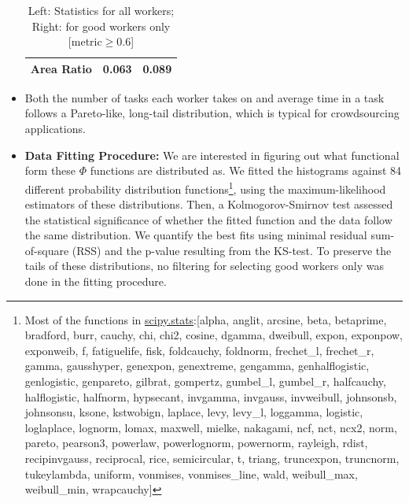 \documentclass[12pt]{article}
\begin{document}
\begin{itemize}
\begin{table}[h]
\begin{tabular}{lrr}
 Area Ratio       &  0.063 &  0.089 \\
\hline
\end{tabular}
\caption{Left: Statistics for all workers; Right: for good workers only [metric$\geq$0.6]}
\label{basic_stat}
\end{table}
\item Both the number of tasks each worker takes on and average time in a task follows a Pareto-like, long-tail distribution, which is typical for crowdsourcing applications.
\item \textbf{Data Fitting Procedure:} We are interested in figuring out what functional form these $\Phi$ functions are distributed as. We fitted the histograms against 84 different probability distribution functions\footnote{Most of the functions in  \href{https://docs.scipy.org/doc/scipy/reference/stats.html}{scipy.stats}:\tiny{[alpha, anglit, arcsine, beta, betaprime, bradford, burr, cauchy, chi, chi2, cosine, dgamma, dweibull, expon, exponpow, exponweib, f, fatiguelife, fisk, foldcauchy, foldnorm, frechet\_l, frechet\_r, gamma, gausshyper, genexpon, genextreme, gengamma, genhalflogistic, genlogistic, genpareto, gilbrat, gompertz, gumbel\_l, gumbel\_r, halfcauchy, halflogistic, halfnorm, hypsecant, invgamma, invgauss, invweibull, johnsonsb, johnsonsu, ksone, kstwobign, laplace, levy, levy\_l, loggamma, logistic, loglaplace, lognorm, lomax, maxwell, mielke, nakagami, ncf, nct, ncx2, norm, pareto, pearson3, powerlaw, powerlognorm, powernorm, rayleigh, rdist, recipinvgauss, reciprocal, rice, semicircular, t, triang, truncexpon, truncnorm, tukeylambda, uniform, vonmises, vonmises\_line, wald, weibull\_max, weibull\_min, wrapcauchy]}}, using the maximum-likelihood estimators of these distributions. Then, a  Kolmogorov-Smirnov test  assessed the statistical significance of whether the fitted function and the data follow the same distribution. We quantify the best fits using minimal residual sum-of-square (RSS) and the p-value resulting from the KS-test.  To preserve the tails of these distributions, no filtering for selecting good workers only was done in the fitting procedure. 
\end{itemize}
\end{document}
